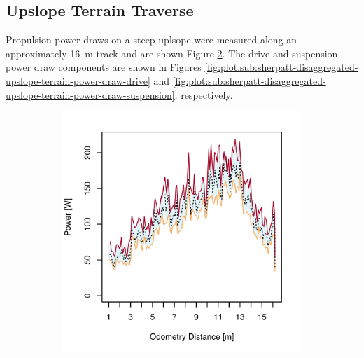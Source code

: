 \subsection{Upslope Terrain Traverse}
\label{sec:PropulsionPowerConstraints:UpslopeTerrainTraverse}
Propulsion power draws on a steep uplsope were measured along an approximately \SI{16}{\meter} track and are shown Figure \ref{fig:plot:sub:sherpatt-disaggregated-upslope-terrain-power-draw-locomotion}. The drive and suspension power draw components are shown in Figures \ref{fig:plot:sub:sherpatt-disaggregated-upslope-terrain-power-draw-drive} and \ref{fig:plot:sub:sherpatt-disaggregated-upslope-terrain-power-draw-suspension}, respectively.

\begin{figure}[h]
\captionsetup[subfigure]{justification=centering}
\vspace{-2ex}
	\centering
    \setlength{\subfigureWidth}{0.32\textwidth}
    \setlength{\graphicsHeight}{50mm}
    \hypersetup{hidelinks=true}%
	\begin{subfigure}[t]{\subfigureWidth}
        \centering
        \includegraphics[height=\graphicsHeight]{sections/locomotion-power-draws/plots/locomotion-power-draw-on-upslope-terrain.png}
		\label{fig:plot:sub:sherpatt-disaggregated-upslope-terrain-power-draw-locomotion}

\end{subfigure}
\end{figure}
